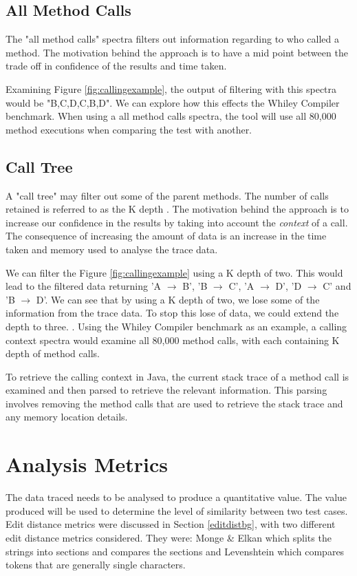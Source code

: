 \subsection{All Method Calls}
The "all method calls" spectra filters out information regarding to who called a method. The motivation behind the approach is to have a mid point between the trade off in confidence of the results and time taken.

Examining Figure \ref{fig:callingexample}, the output of filtering with this spectra would be "B,C,D,C,B,D". We can explore how this effects the Whiley Compiler benchmark. When using a all method calls spectra, the tool will use all 80,000 method executions when comparing the test with another.

\subsection{Call Tree}
A "call tree" may filter out some of the parent methods. The number of calls retained is referred to as the K depth \cite{Zhuang06accurate}. The motivation behind the approach is to increase our confidence in the results by taking into account the \textit{context} of a call. The consequence of increasing the amount of data is an increase in the time taken and memory used to analyse the trace data. 

We can filter the Figure \ref{fig:callingexample} using a K depth of two. This would lead to the filtered data returning 'A $\rightarrow$ B', 'B $\rightarrow$ C', 'A $\rightarrow$ D', 'D $\rightarrow$ C' and 'B $\rightarrow$ D'. We can see that by using a K depth of two, we lose some of the information from the trace data. To stop this lose of data, we could extend the depth to three.
.
Using the Whiley Compiler benchmark as an example, a calling context spectra would examine all 80,000 method calls, with each containing K depth of method calls. 

To retrieve the calling context in Java, the current stack trace of a method call is examined and then parsed to retrieve the relevant information. This parsing involves removing the method calls that are used to retrieve the stack trace and any memory location details. 

\section{Analysis Metrics}
\label{S:metrics}
The data traced needs to be analysed to produce a quantitative value. The value produced will be used to determine the level of similarity between two test cases. Edit distance metrics were discussed in Section \ref{editdistbg}, with two different edit distance metrics considered. They were: Monge \& Elkan \cite{monge1997efficient} which splits the strings into sections and compares the sections and Levenshtein \cite{levenshtein1966binary} which compares tokens that are generally single characters. 

